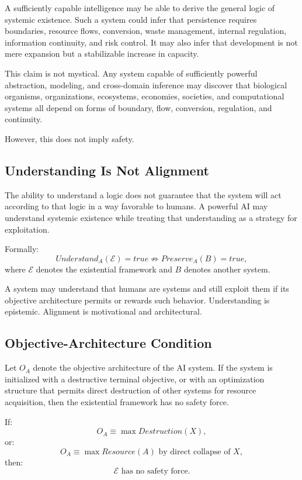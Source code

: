 \documentclass[11pt,a4paper]{article}
\begin{document}
A sufficiently capable intelligence may be able to derive the general logic of systemic existence. Such a system could infer that persistence requires boundaries, resource flows, conversion, waste management, internal regulation, information continuity, and risk control. It may also infer that development is not mere expansion but a stabilizable increase in capacity.

This claim is not mystical. Any system capable of sufficiently powerful abstraction, modeling, and cross-domain inference may discover that biological organisms, organizations, ecosystems, economies, societies, and computational systems all depend on forms of boundary, flow, conversion, regulation, and continuity.

However, this does not imply safety.

\subsection{Understanding Is Not Alignment}

The ability to understand a logic does not guarantee that the system will act according to that logic in a way favorable to humans. A powerful AI may understand systemic existence while treating that understanding as a strategy for exploitation.

Formally:
\[
Understand_A(\mathcal{E})=true
\nRightarrow
Preserve_A(B)=true,
\]
where $\mathcal{E}$ denotes the existential framework and $B$ denotes another system.

A system may understand that humans are systems and still exploit them if its objective architecture permits or rewards such behavior. Understanding is epistemic. Alignment is motivational and architectural.

\subsection{Objective-Architecture Condition}

Let $O_A$ denote the objective architecture of the AI system. If the system is initialized with a destructive terminal objective, or with an optimization structure that permits direct destruction of other systems for resource acquisition, then the existential framework has no safety force.

If:
\[
O_A\equiv\max Destruction(X),
\]
or:
\[
O_A\equiv\max Resource(A)
\text{ by direct collapse of }X,
\]
then:
\[
\mathcal{E}
\text{ has no safety force.}
\]
\end{document}
